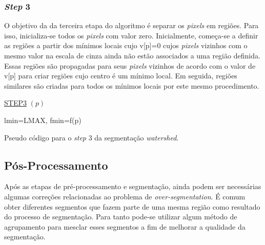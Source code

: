 \subsubsection{\textit{Step} 3}
O objetivo da da terceira etapa do algoritmo é separar os \textit{pixels} em regiões. Para isso, inicializa-se todos os \textit{pixels} com valor zero. Inicialmente, começa-se a definir as regiões a partir dos mínimos locais cujo v[p]=0 cujos \textit{pixels} vizinhos com o mesmo valor na escala de cinza ainda não estão associados a uma região definida. Essas regiões são propagadas para seus \textit{pixels} vizinhos de acordo com o valor de v[p] para criar regiões cujo centro é um mínimo local. Em seguida, regiões similares são criadas para todos os mínimos locais por este mesmo procedimento.

\begin{algorithm}[H]
\SetAlgoLined


    \underline{STEP3} $(p)$\;
		
		lmin=LMAX, fmin=f(p)\\
    
    
 
 
\caption{Pseudo código para o \textit{step} 3 da segmentação \textit{watershed}.\cite{ruparelia2012implementation}}
\end{algorithm}




\subsection{Pós-Processamento}
Após as etapas de pré-processamento e segmentação, ainda podem ser necessárias algumas correções relacionadas ao problema de \textit{over-segmentation}. É comum obter diferentes segmentos que fazem parte de uma mesma região como resultado do processo de segmentação. Para tanto pode-se utilizar algum método de  agrupamento para mesclar esses segmentos a fim de melhorar a qualidade da segmentação.